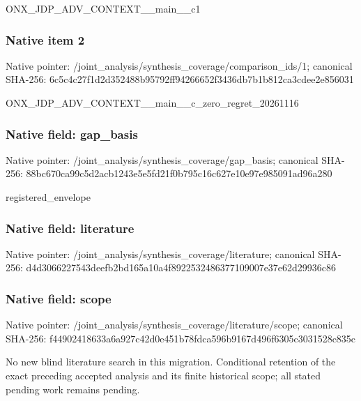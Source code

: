 \documentclass[10pt,a4paper]{article}
\begin{document}
\begingroup\raggedright\sloppy ONX\_\allowbreak{}JDP\_\allowbreak{}ADV\_\allowbreak{}CONTEXT\_\allowbreak{}\_\allowbreak{}main\_\allowbreak{}\_\allowbreak{}c1\par\endgroup

\subsubsection{Native item 2}
Native pointer: /joint\_\allowbreak{}analysis/synthesis\_\allowbreak{}coverage/comparison\_\allowbreak{}ids/1; canonical SHA-256: 6c5c4c27f1d2d352488b95792ff94266652f3436db7b1b812ca3cdee2e856031

\begingroup\raggedright\sloppy ONX\_\allowbreak{}JDP\_\allowbreak{}ADV\_\allowbreak{}CONTEXT\_\allowbreak{}\_\allowbreak{}main\_\allowbreak{}\_\allowbreak{}c\_\allowbreak{}zero\_\allowbreak{}regret\_\allowbreak{}20261116\par\endgroup

\subsubsection{Native field: gap\_\allowbreak{}basis}
Native pointer: /joint\_\allowbreak{}analysis/synthesis\_\allowbreak{}coverage/gap\_\allowbreak{}basis; canonical SHA-256: 88bc670ca99c5d2acb1243e5e5fd21f0b795c16c627e10e97e985091ad96a280

\begingroup\raggedright\sloppy registered\_\allowbreak{}envelope\par\endgroup

\subsubsection{Native field: literature}
Native pointer: /joint\_\allowbreak{}analysis/synthesis\_\allowbreak{}coverage/literature; canonical SHA-256: d4d3066227543deefb2bd165a10a4f8922532486377109007e37e62d29936c86

\subsubsection{Native field: scope}
Native pointer: /joint\_\allowbreak{}analysis/synthesis\_\allowbreak{}coverage/literature/scope; canonical SHA-256: f44902418633a6a927c42d0e451b78fdca596b9167d496f6305c3031528c835c

\begingroup\raggedright\sloppy No new blind literature search in this migration. Conditional retention of the exact preceding accepted analysis and its finite historical scope;\allowbreak{} all stated pending work remains pending.\par\endgroup
\end{document}

